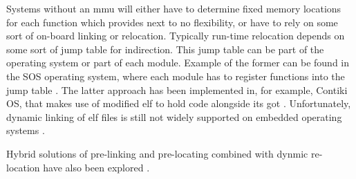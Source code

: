 Systems without an \gls{mmu} will either have to determine fixed memory locations for each function which provides next to no flexibility, or have to rely on some sort of on-board linking or relocation. Typically run-time relocation depends on some sort of jump table for indirection. This jump table can be part of the operating system or part of each module. Example of the former can be found in the SOS operating system, where each module has to register functions into the jump table \cite{Han2005}. The latter approach has been implemented in, for example, Contiki OS, that makes use of modified \gls{elf} to hold code alongside its \gls{got} \cite{Dunkels2006}. Unfortunately, dynamic linking of \gls{elf} files is still not widely supported on embedded operating systems \cite{Xinyu2017}.

Hybrid solutions of pre-linking and pre-locating combined with dynmic re-location have also been explored \cite{Dong2009}.

